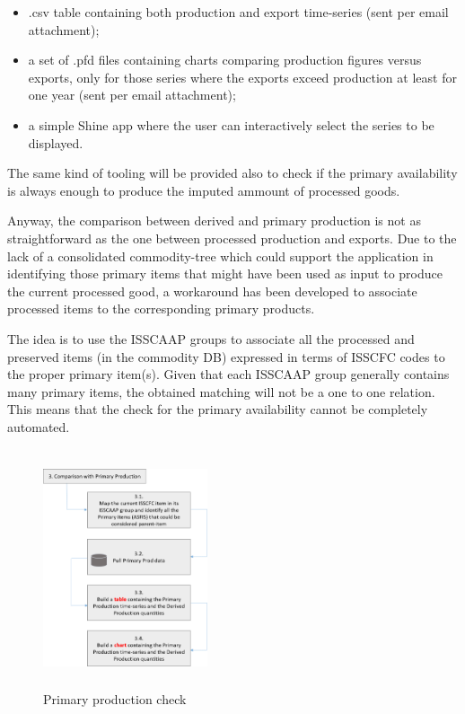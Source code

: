 \documentclass[nojss]{jss}
\begin{document}
\begin{itemize}
\item.csv table containing both production and export time-series (sent per email attachment);
\item  a set of .pfd files containing charts comparing production figures versus exports, only for those series where the exports exceed production at least for one year (sent per email attachment);
\item a simple Shine app where the user can interactively select the series to be displayed.
\end{itemize}

The same kind of tooling will be provided also to check if the primary availability is always
enough to produce the imputed ammount of processed goods.

Anyway, the comparison between derived and primary production is not as straightforward
as the one between processed production and exports. Due to the lack of a consolidated commodity-tree which could support the application in identifying those primary items that might have been used as input to produce the current processed good, a workaround has been developed to associate processed items to the corresponding primary products.

The idea is to use the ISSCAAP groups to associate all the processed and preserved items (in the commodity DB) expressed in terms of ISSCFC codes to the proper primary item(s). Given that each ISSCAAP group generally contains many primary items, the obtained matching will not be a one to one relation. This means that the check for the primary availability cannot be completely automated.



\begin{figure}
\includegraphics[height=7cm,width=4.84cm]{plot/PrimaryProdCheck.png}
\caption{Primary production check}
\end{figure}
\end{document}
